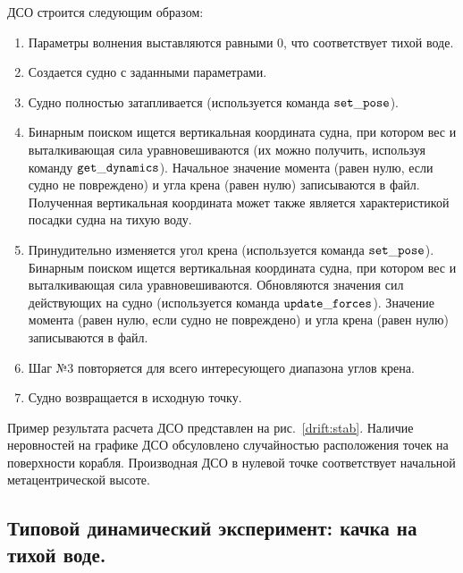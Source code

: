 ДСО строится следующим образом:
\begin{enumerate}
	\item	Параметры волнения выставляются равными 0, что соответствует тихой воде.
	\item	Создается судно с заданными параметрами.
	\item	Судно полностью затапливается (используется команда $\tt set\_pose$).
	\item	Бинарным поиском ищется вертикальная координата судна, 
			при котором вес и выталкивающая сила уравновешиваются (их можно получить, используя команду 
			$\tt get\_dynamics$). 
			Начальное значение момента (равен нулю, если судно не повреждено) и угла крена (равен нулю)
			записываются в файл. Полученная вертикальная координата может также 
			является характеристикой посадки судна на тихую воду.
	\item	Принудительно изменяется угол крена (используется команда $\tt set\_pose$). 
			Бинарным поиском ищется вертикальная координата судна, 
			при котором вес и выталкивающая сила уравновешиваются. 
			Обновляются значения сил действующих на судно (используется команда $\tt update\_forces$).
			Значение момента (равен нулю, если судно не повреждено) и угла крена (равен нулю)
			записываются в файл.
	\item	Шаг №3 повторяется для всего интересующего диапазона углов крена.
	\item	Судно возвращается в исходную точку.
\end{enumerate}

Пример результата расчета ДСО представлен на рис.~\ref{drift:stab}. Наличие неровностей на графике ДСО обсуловлено случайностью расположения точек на поверхности корабля. Производная ДСО в нулевой точке соответствует начальной метацентрической высоте.



\subsection{Типовой динамический эксперимент: качка на тихой воде.}

